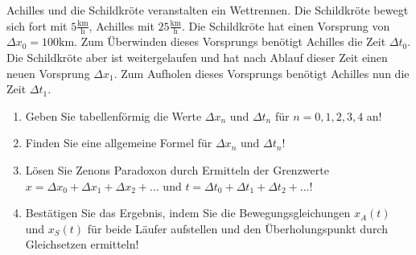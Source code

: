 \item Achilles und die Schildkröte veranstalten ein Wettrennen. Die Schildkröte bewegt sich fort mit $5\frac{\text{km}}{\text{h}}$, Achilles mit $25\frac{\text{km}}{\text{h}}$. Die Schildkröte hat einen Vorsprung von $\Delta x_0 = 100\text{km}$. Zum Überwinden dieses Vorsprungs benötigt Achilles die Zeit $\Delta t_0$. Die Schildkröte aber ist weitergelaufen und hat nach Ablauf dieser Zeit einen neuen Vorsprung $\Delta x_1$. Zum Aufholen dieses Vorsprungs benötigt Achilles nun die Zeit $\Delta t_1$. 
\begin{enumerate}
\item Geben Sie tabellenförmig die Werte $\Delta x_n$ und $\Delta t_n$ für $n=0,1,2,3,4$ an!
\item Finden Sie eine allgemeine Formel für $\Delta x_n$ und $\Delta t_n$!
\item Lösen Sie Zenons Paradoxon durch Ermitteln der Grenzwerte $x = \Delta x_0 + \Delta x_1 + \Delta x_2 + ...$ und $t = \Delta t_0 + \Delta t_1 + \Delta t_2 + ...$!
\item Bestätigen Sie das Ergebnis, indem Sie die Bewegungsgleichungen $x_A(t)$ und $x_S(t)$ für beide Läufer aufstellen und den Überholungspunkt durch Gleichsetzen ermitteln!
\end{enumerate}
